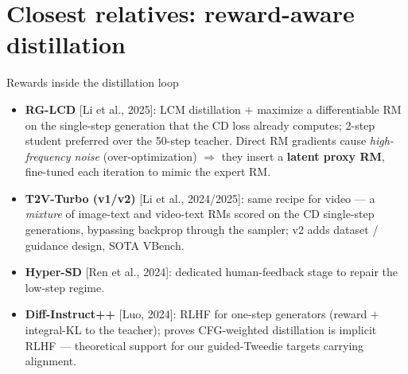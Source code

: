 \documentclass[aspectratio=169,10pt]{beamer}
\newcommand{\litref}[1]{{\scriptsize\color{black!55}[#1]}}
\begin{document}
\section{Closest relatives: reward-aware distillation}

\begin{frame}{Rewards inside the distillation loop}
  \begin{itemize}
    \item \textbf{RG-LCD} \litref{Li et al., 2025}: LCM distillation $+$
      maximize a differentiable RM on the single-step generation that the CD
      loss already computes; 2-step student preferred over the 50-step
      teacher. Direct RM gradients cause \emph{high-frequency noise}
      (over-optimization) $\Rightarrow$ they insert a \textbf{latent proxy
      RM}, fine-tuned each iteration to mimic the expert RM.
    \item \textbf{T2V-Turbo (v1/v2)} \litref{Li et al., 2024/2025}: same
      recipe for video --- a \emph{mixture} of image-text and video-text RMs
      scored on the CD single-step generations, bypassing backprop through
      the sampler; v2 adds dataset / guidance design, SOTA VBench.
    \item \textbf{Hyper-SD} \litref{Ren et al., 2024}: dedicated
      human-feedback stage to repair the low-step regime.
    \item \textbf{Diff-Instruct++} \litref{Luo, 2024}: RLHF for one-step
      generators (reward $+$ integral-KL to the teacher); proves
      \alert{CFG-weighted distillation is implicit RLHF} --- theoretical
      support for our guided-Tweedie targets carrying alignment.
  \end{itemize}
\end{frame}
\end{document}
